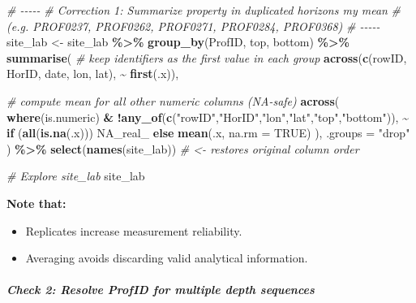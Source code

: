 \documentclass[
  10pt,
  b5paper,
  oneside]{book}
\newenvironment{Shaded}{\begin{snugshade}}{\end{snugshade}}
\newcommand{\AttributeTok}[1]{\textcolor[rgb]{0.13,0.29,0.53}{#1}}
\newcommand{\CommentTok}[1]{\textcolor[rgb]{0.56,0.35,0.01}{\textit{#1}}}
\newcommand{\ConstantTok}[1]{\textcolor[rgb]{0.56,0.35,0.01}{#1}}
\newcommand{\ControlFlowTok}[1]{\textcolor[rgb]{0.13,0.29,0.53}{\textbf{#1}}}
\newcommand{\FunctionTok}[1]{\textcolor[rgb]{0.13,0.29,0.53}{\textbf{#1}}}
\newcommand{\NormalTok}[1]{#1}
\newcommand{\OtherTok}[1]{\textcolor[rgb]{0.56,0.35,0.01}{#1}}
\newcommand{\SpecialCharTok}[1]{\textcolor[rgb]{0.81,0.36,0.00}{\textbf{#1}}}
\newcommand{\StringTok}[1]{\textcolor[rgb]{0.31,0.60,0.02}{#1}}
\begin{document}
\begin{Shaded}
\begin{Highlighting}[]
\CommentTok{\# {-}{-}{-}{-}{-}}
\CommentTok{\# Correction 1: Summarize property in duplicated horizons my mean}
\CommentTok{\# (e.g. PROF0237, PROF0262, PROF0271, PROF0284, PROF0368)}
\CommentTok{\# {-}{-}{-}{-}{-}}
\NormalTok{site\_lab }\OtherTok{\textless{}{-}}\NormalTok{ site\_lab }\SpecialCharTok{\%\textgreater{}\%}
  \FunctionTok{group\_by}\NormalTok{(ProfID, top, bottom) }\SpecialCharTok{\%\textgreater{}\%}
  \FunctionTok{summarise}\NormalTok{(}
    \CommentTok{\# keep identifiers as the first value in each group}
    \FunctionTok{across}\NormalTok{(}\FunctionTok{c}\NormalTok{(rowID, HorID, date, lon, lat), }\SpecialCharTok{\textasciitilde{}} \FunctionTok{first}\NormalTok{(.x)),}
    
    \CommentTok{\# compute mean for all other numeric columns (NA{-}safe)}
    \FunctionTok{across}\NormalTok{(}
      \FunctionTok{where}\NormalTok{(is.numeric) }\SpecialCharTok{\&} \SpecialCharTok{!}\FunctionTok{any\_of}\NormalTok{(}\FunctionTok{c}\NormalTok{(}\StringTok{"rowID"}\NormalTok{,}\StringTok{"HorID"}\NormalTok{,}\StringTok{"lon"}\NormalTok{,}\StringTok{"lat"}\NormalTok{,}\StringTok{"top"}\NormalTok{,}\StringTok{"bottom"}\NormalTok{)),}
      \SpecialCharTok{\textasciitilde{}} \ControlFlowTok{if}\NormalTok{ (}\FunctionTok{all}\NormalTok{(}\FunctionTok{is.na}\NormalTok{(.x))) }\ConstantTok{NA\_real\_} \ControlFlowTok{else} \FunctionTok{mean}\NormalTok{(.x, }\AttributeTok{na.rm =} \ConstantTok{TRUE}\NormalTok{)}
\NormalTok{    ),}
    \AttributeTok{.groups =} \StringTok{"drop"}
\NormalTok{  ) }\SpecialCharTok{\%\textgreater{}\%}
  \FunctionTok{select}\NormalTok{(}\FunctionTok{names}\NormalTok{(site\_lab))   }\CommentTok{\# \textless{}{-} restores original column order}

\CommentTok{\# Explore site\_lab}
\NormalTok{site\_lab}
\end{Highlighting}
\end{Shaded}

\textbf{Note that:}

\begin{itemize}
\item
  Replicates increase measurement reliability.
\item
  Averaging avoids discarding valid analytical information.
\end{itemize}

\subparagraph*{Check 2: Resolve ProfID for multiple depth sequences}\label{check-2-resolve-profid-for-multiple-depth-sequences}
\end{document}
